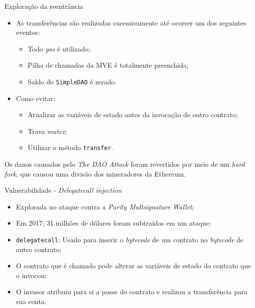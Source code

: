 \begin{frame}{Exploração da reentrância}
    \begin{itemize}
        \item As transferências são realizadas sucessivamente até ocorrer um dos seguintes eventos:
        \begin{itemize}
            \item Todo \textit{gas} é utilizado;
            \item Pilha de chamadas da MVE é totalmente preenchida;
            \item Saldo do \texttt{SimpleDAO} é zerado.
        \end{itemize}
        \item Como evitar:
        \begin{itemize}
            \item Atualizar as variáveis de estado antes da invocação de outro contrato;
            \item Trava \textit{mutex};
            \item Utilizar o método \texttt{transfer}.
        \end{itemize}
    \end{itemize}
    \begin{block}{}
    Os danos causados pelo \textit{The DAO Attack} foram revertidos por meio de um \textit{hard fork}, que causou uma divisão dos mineradores da Ethereum.
    \end{block}
\end{frame}

\begin{frame}{Vulnerabilidade - \textit{Delegatecall injection}}
    \begin{itemize}
        \item Explorada no ataque contra a \textit{Parity Multsignature Wallet};
        \item Em 2017, 31 milhões de dólares foram subtraídos em um ataque;
        \item \texttt{delegatecall}: Usado para inserir o \textit{bytecode} de um contrato no \textit{bytecode} de outro contrato;
        \item O contrato que é chamado pode alterar as variáveis de estado do contrato que o invocou;
        \item O invasor atribuiu para si a posse do contrato e realizou a transferência para sua conta.
    \end{itemize}
\end{frame}

